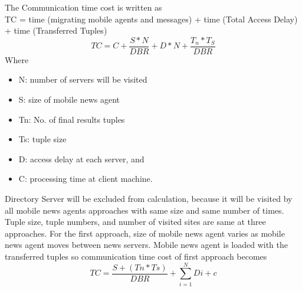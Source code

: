 \documentclass[12pt,a4paper,final,twoside,onecolumn,titlepage]{book}
\begin{document}
The Communication time cost is written as \\
TC = time (migrating mobile agents and messages) + time (Total Access Delay) + time (Transferred Tuples)\\
\begin{equation}
TC = C + \frac{S * N}{DBR} + D * N + \frac{T_{n}*T_{S}}{DBR}
\label{eq1}
\end{equation}
Where
\begin{itemize}
\item N: number of servers will be visited
\item S: size of mobile news agent
\item Tn: No. of final results tuples
\item Ts: tuple size
\item D: access delay at each server, and 
\item C: processing time at client machine.
\end{itemize}

Directory Server will be excluded from calculation, because it will be visited by all mobile news agents approaches with same size and same number of times. Tuple size, tuple numbers, and number of visited sites are same at three approaches. For the first approach, size of mobile news agent varies as mobile news agent moves between news servers. Mobile news agent is loaded with the transferred tuples so communication time cost of first approach becomes 
\begin{equation}
TC = \frac{S+(Tn*Ts)}{DBR} + \sum_{i=1}^{N}Di+c
\label{eq2}
\end{equation}
\end{document}
